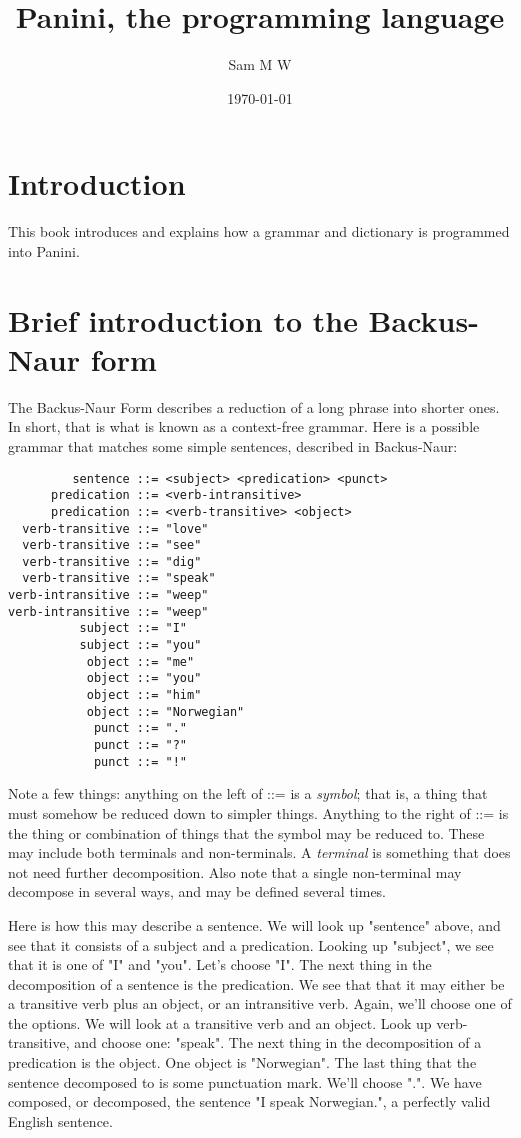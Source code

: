 \documentclass{article}
\title{Panini, the programming language}
\author{Sam M W}
\date{\today}
\begin{document}
\label{start}

\maketitle

\section{Introduction}

This book introduces and explains how a grammar and dictionary is programmed
into Panini.

\section{Brief introduction to the Backus-Naur form}
The Backus-Naur Form describes a reduction of a long phrase into shorter ones.
In short, that is what is known as a context-free grammar. Here is a possible
grammar that matches some simple sentences, described in Backus-Naur:

\begin{lstlisting}
         sentence ::= <subject> <predication> <punct>
      predication ::= <verb-intransitive>
      predication ::= <verb-transitive> <object>
  verb-transitive ::= "love"
  verb-transitive ::= "see"
  verb-transitive ::= "dig"
  verb-transitive ::= "speak"
verb-intransitive ::= "weep" 
verb-intransitive ::= "weep" 
          subject ::= "I"
          subject ::= "you"
           object ::= "me"
           object ::= "you"
           object ::= "him"
           object ::= "Norwegian"
            punct ::= "." 
            punct ::= "?"
            punct ::= "!"
\end{lstlisting}
Note a few things: anything on the left of ::= is a \emph{symbol}; that is, a
thing that must somehow be reduced down to simpler things. Anything to the right
of ::= is the thing or combination of things that the symbol may be reduced to.
These may include both terminals and non-terminals. A \emph{terminal} is
something that does not need further decomposition. Also note that a single
non-terminal may decompose in several ways, and may be defined several times.

Here is how this may describe a sentence. We will look up "sentence" above, and
see that it consists of a subject and a predication. Looking up "subject", we
see that it is one of "I" and "you". Let's choose "I". The next thing in the
decomposition of a sentence is the predication. We see that that it may either
be a transitive verb plus an object, or an intransitive verb. Again, we'll
choose one of the options. We will look at a transitive verb and an object. Look
up verb-transitive, and choose one: "speak". The next thing in the decomposition
of a predication is the object. One object is "Norwegian". The last thing that
the sentence decomposed to is some punctuation mark. We'll choose ".". We have
composed, or decomposed, the sentence "I speak Norwegian.", a perfectly valid 
English sentence.
\end{document}
